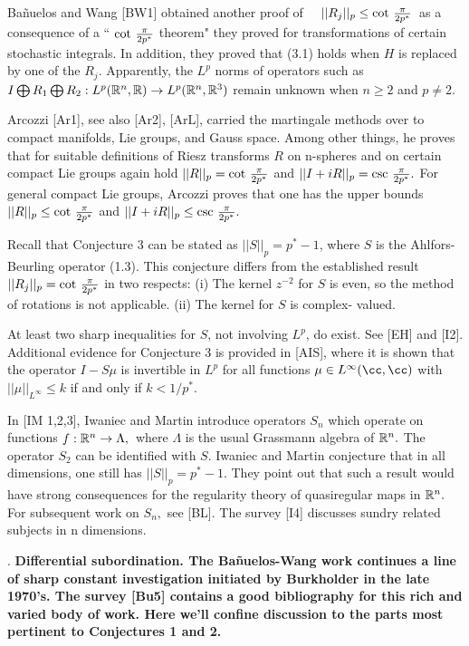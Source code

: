 Ba\~nuelos and Wang [BW1] obtained another proof of $\quad||R_j||_p \leq
\cot\,{{\pi}\over {2p^*}}\,$ 
as a consequence of a `` $\cot\,{{\pi}\over {2p^*}}$ theorem" they proved for 
transformations of certain stochastic integrals. In addition, they  proved 
that (3.1) holds when $H$ is replaced by one of the $R_j.$ Apparently, the 
$L^p$ norms of operators such as $I \bigoplus R_1 \bigoplus R_2: L^p({\Bbb R}^n, 
\Bbb R)\rightarrow  
L^p({\Bbb R}^n, {\Bbb R}^3)$ remain unknown when $n\geq 2$ and $p\ne 2.$ 

Arcozzi [Ar1], see also [Ar2], [ArL], carried the martingale methods over to compact 
manifolds, Lie groups, and Gauss space. Among other things, he proves that for 
suitable definitions of Riesz  
transforms $R$ on n-spheres and on certain compact Lie groups again hold 
$||R||_p = \cot\,{{\pi}\over {2p^*}}$ and $||I + iR||_p = \csc
\,{{\pi}\over {2p^*}}.$ For general compact Lie groups, Arcozzi proves that one 
has the upper bounds $||R||_p \leq \cot\,{{\pi}\over {2p^*}}$ and $||I + 
iR||_p \leq \csc \,{{\pi}\over {2p^*}}.$

Recall that Conjecture 3 can be stated as $||S||_p 
= p^* - 1$, where $S$ is the Ahlfors-Beurling operator (1.3). This conjecture 
differs from the established result $||R_j||_p = \cot\,{{\pi}\over 
{2p^*}}$ in two respects: (i) The kernel $z^{-2}$ for $S$ is even, so the 
method of rotations is not applicable. (ii) The kernel for $S$ is complex-
valued. 

At least two sharp inequalities for $S$, not involving $L^p$, do 
exist. See [EH] and [I2]. Additional evidence for Conjecture 3 is provided in [AIS], where it is 
shown that the operator $I-S\mu$ is invertible in $L^p$ for all 
functions $\mu\in L^{\infty}(\cc,\cc)$ with $||\mu||_{L^{\infty}}\leq k$ if and 
only if $k<1/p^*.$ 

In [IM 1,2,3], Iwaniec and Martin introduce operators $S_n$ which operate on 
functions $f:{\Bbb R}^n\rightarrow \Lambda,\,$ where $\Lambda$ is the usual 
Grassmann algebra of ${\Bbb R}^n.$ The operator $S_2$ can be identified with $S$.
Iwaniec and Martin conjecture that in all dimensions, one still has $||S||_p =
p^*-1.$ They point out that such a result would have strong consequences for 
the regularity theory of quasiregular maps in ${\Bbb R}^n.$ For subsequent work 
on $S_n,$ see [BL]. The survey [I4] discusses sundry related subjects in 
n dimensions.\bigskip

. \bf Differential subordination. \rm The Ba\~nuelos-Wang work 
continues a line of sharp constant investigation initiated 
by Burkholder in the late 1970's. The survey [Bu5] contains a good  
bibliography for this rich and varied body of work. Here we'll confine 
discussion to the parts most pertinent to Conjectures 1 and  2.  

